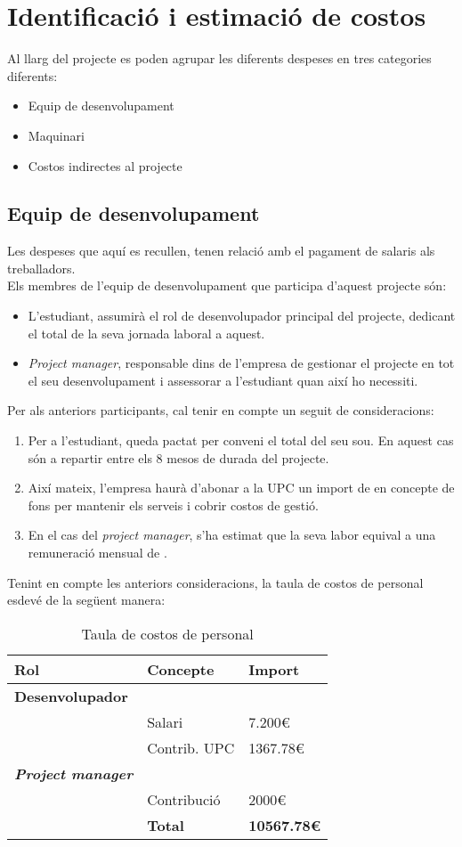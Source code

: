 \section{Identificació i estimació de costos}
\label{gestio:despeses}
Al llarg del projecte es poden agrupar les diferents despeses en tres categories diferents:
\begin{itemize}
	\item Equip de desenvolupament
	\item Maquinari
	\item Costos indirectes al projecte
\end{itemize}

\subsection{Equip de desenvolupament}
Les despeses que aquí es recullen, tenen relació amb el pagament de salaris als treballadors.\\
Els membres de l'equip de desenvolupament que participa d'aquest projecte són:
\begin{itemize}
    \item L'estudiant, assumirà el rol de desenvolupador principal del projecte, dedicant el total de la seva jornada laboral a aquest.
    \item \textit{Project manager}, responsable dins de l'empresa de gestionar el projecte en tot el seu desenvolupament i assessorar a l'estudiant quan així ho necessiti.
\end{itemize}
Per als anteriors participants, cal tenir en compte un seguit de consideracions:
\begin{enumerate}
    \item Per a l'estudiant, queda pactat per conveni el total del seu sou. En aquest cas són  a repartir entre els 8 mesos de durada del projecte. 
    \item Així mateix, l'empresa haurà d'abonar a la UPC un import de  en concepte de fons per mantenir els serveis i cobrir costos de gestió.
    \item En el cas del \textit{project manager}, s'ha estimat que la seva labor equival a una remuneració mensual de .
\end{enumerate}
Tenint en compte les anteriors consideracions, la taula de costos de personal esdevé de la següent manera:
\begin{table}[h!]
  \centering
  \label{tab:costos}
  \begin{tabular}{l  l  l}
    	\textbf{Rol} & \textbf{Concepte} & \textbf{Import} \\
    	\midrule
    	\textbf{Desenvolupador} &  & \\
    	& Salari & 7.200\euro \\
    	& Contrib. UPC & 1367.78\euro\\
    	\textbf{\textit{Project manager}} &  & \\
    	& Contribució & 2000\euro\\
    	\midrule
    	& \textbf{Total} & \textbf{10567.78\euro} \\
    	\bottomrule
  \end{tabular}
  \caption{Taula de costos de personal}
\end{table}
\clearpage
